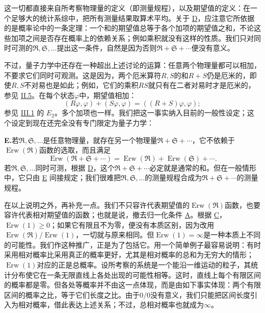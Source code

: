 \documentclass[fontsize=13pt,twoside,openany,headings=normal,parskip=false,bookmarkpackage=false,DIV=calc]{scrbook}
\begin{document}
这一切都直接来自所考察物理量的定义（即测量规程），以及期望值的定义：在一个足够大的统计系综中，把所有测量结果取算术平均。关于 \hyperref[cond:IV.1.D]{D}，应注意它所依据的是概率论中的一条定理：一个和的期望值总等于各个加项的期望值之和，不论这些加项之间是否存在概率上的依赖关系；例如乘积就没有这样的性质。我们只对同时可测的$\mathfrak R,\allowbreak \mathfrak S,\allowbreak \ldots$提出这一条件，自然是因为否则$\mathfrak R+\mathfrak S+\cdots$便没有意义。

不过，量子力学中还存在一种超出上述讨论的运算：任意两个物理量都可以相加，不要求它们同时可观测。这是因为，两个厄米算符$R,\allowbreak S$的和$R+S$仍是厄米的，即使$R,\allowbreak S$不对易也是如此；例如，它们的乘积$RS$就只有在二者对易时才是厄米的，参见 \hyperref[sec:II.5]{II.5}。在每个状态$\varphi$中，期望值相加：
\[
(R\varphi,\varphi)+(S\varphi,\varphi)=((R+S)\varphi,\varphi);
\]
参见 \hyperref[sec:III.1]{III.1} 的 \hyperref[post:III.1.E2]{$E_2$}。多个加项也一样。我们把这一事实纳入目前的一般性设定；这个设定到现在还完全没有专门限定为量子力学：

\noindent{}\textbf{E.}\label{cond:IV.1.E}若$\mathfrak R,\allowbreak \mathfrak S,\allowbreak \ldots$是任意物理量，就存在另一个物理量$\mathfrak R+\mathfrak S+\cdots$，它不依赖于$\operatorname{Erw}(\mathfrak R)$函数的选取，而且满足
\[
\operatorname{Erw}(\mathfrak R+\mathfrak S+\cdots)=\operatorname{Erw}(\mathfrak R)+\operatorname{Erw}(\mathfrak S)+\cdots.
\]
若$\mathfrak R,\allowbreak \mathfrak S,\allowbreak \ldots$同时可测，根据 \hyperref[cond:IV.1.D]{D}，这个$\mathfrak R+\mathfrak S+\cdots$必定就是通常的和。但在一般情形中，它只由 \hyperref[cond:IV.1.E]{E} 间接规定；我们很难把$\mathfrak R,\allowbreak \mathfrak S,\allowbreak \ldots$的测量规程合成为$\mathfrak R+\mathfrak S+\cdots$的测量规程。

在以上说明之外，再补充一点。我们不只容许代表期望值的$\operatorname{Erw}(\mathfrak R)$函数，也要容许代表相对期望值的函数；也就是说，撤去归一化条件 \hyperref[cond:IV.1.A]{A}。根据 \hyperref[cond:IV.1.C]{C}，$\operatorname{Erw}(1)\geq0$；如果它有限且不为零，便没有本质区别，因为改用$\operatorname{Erw}(\mathfrak R)/\operatorname{Erw}(1)$，一切就与原来相同。但$\operatorname{Erw}(1)=\infty$是一种本质上不同的可能性。我们作这种\hypertarget{origpage-165}{}\label{origpage-165}推广，正是为了包括它。用一个简单例子最容易说明：有时采用相对概率比采用真正的概率更好，尤其是相对概率的总和为无穷大的情形；$\operatorname{Erw}(1)$对应的正是总概率。设所考察的系统是一个能沿一维运动的粒子，其统计分布使它在一条无限直线上各处出现的可能性相等。这时，直线上每个有限区间的概率都是零。但各处等概率并不由这一点体现，而是由如下事实体现：两个有限区间的概率之比，等于它们长度之比。由于$0/0$没有意义，我们只能把区间长度引入为相对概率，借此表达上述关系；不过，总相对概率也就成为$\infty$。
\end{document}
